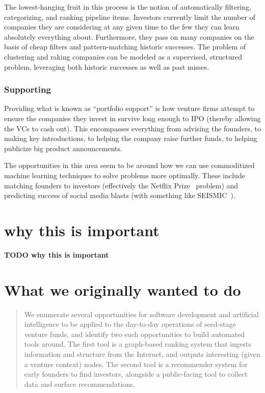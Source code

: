 The lowest-hanging fruit in this process is the notion of automatically filtering, categorizing, and ranking pipeline items. Investors currently limit the number of companies they are considering at any given time to the few they can learn absolutely everything about. Furthermore, they pass on many companies on the basis of cheap filters and pattern-matching historic successes. The problem of clustering and raking companies can be modeled as a supervised, structured problem, leveraging both historic successes as well as past misses.

\subsubsection{Supporting}

Providing what is known as ``portfolio support'' is how venture firms attempt to ensure the companies they invest in survive long enough to IPO (thereby allowing the VCs to cash out). This encompasses everything from advising the founders, to making key introductions, to helping the company raise further funds, to helping publicize big product announcements.

The opportunities in this area seem to be around how we can use commoditized machine learning techniques to solve problems more optimally. These include matching founders to investors (effectively the Netflix Prize~\cite{netflixpize} problem) and predicting success of social media blasts (with something like SEISMIC~\cite{seismic}).

\section{why this is important}

\textbf{TODO why this is important}

\section{What we originally wanted to do}

\begin{quotation}
We enumerate several opportunities for software development and artificial intelligence to be applied to the day-to-day operations of seed-stage venture funds, and identify two such opportunities to build automated tools around. The first tool is a graph-based ranking system that ingests information and structure from the Internet, and outputs interesting (given a venture context) nodes. The second tool is a recommender system for early founders to find investors, alongside a public-facing tool to collect data and surface recommendations.
\end{quotation}


